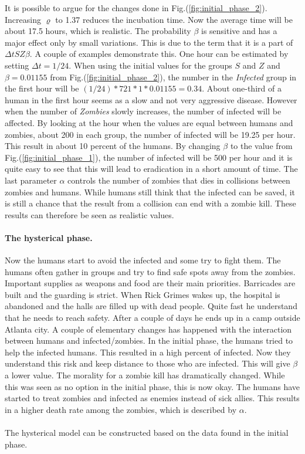 \documentclass[%
twoside,                 %
final,                   %
chapterprefix=true,      %
open=right               %
10pt]{book}
\begin{document}
It is possible to argue for the changes done in Fig.(\ref{fig:initial_phase_2}). Increasing $\varrho$ to 1.37 reduces the incubation time. Now the average time will be about 17.5 hours, which is realistic. The probability $\beta$ is sensitive and has a major effect only by small variations. This is due to the term that it is a part of $\Delta t SZ \beta$. A couple of examples demonstrate this. One hour can be estimated by setting $\Delta t = 1/24$. When using the initial values for the groups $S$ and $Z$ and $\beta=0.01155$ from Fig.(\ref{fig:initial_phase_2}), the number in the \emph{Infected} group in the first hour will be $(1/24)*721*1*0.01155=0.34$. About  one-third of a human in the first hour seems as a slow and not very aggressive disease. However when the number of \emph{Zombies} slowly increases, the number of infected will be affected. By looking at the hour when the values are equal between humans and zombies, about 200 in each group, the number of infected will be 19.25 per hour. This result in about 10 percent of the humans. By changing $\beta$ to the value from Fig.(\ref{fig:initial_phase_1}), the number of infected will be 500 per hour and it is quite easy to see that this will lead to eradication in a short amount of time. The last parameter $\alpha$ controls the number of zombies that dies in collisions between zombies and humans. While humans still think that the infected can be saved, it is still a chance that the result from a collision can end with a zombie kill. These results can therefore be seen as realistic values.

\paragraph{The hysterical phase.}
Now the humans start to avoid the infected and some try to fight them. The humans often gather in groups and try to find safe spots away from the zombies. Important supplies as weapons and food are their main priorities. Barricades are built and the guarding is strict. When Rick Grimes wakes up, the hospital is abandoned and the halls are filled up with dead people. Quite fast he understand that he needs to reach safety. After a couple of days he ends up in a camp outside Atlanta city. A couple of elementary changes has happened with the interaction between humans and infected/zombies. In the initial phase, the humans tried to help the infected humans. This resulted in a high percent of infected. Now they understand this risk and keep distance to those who are infected. This will give $\beta$ a lower value. The morality for a zombie kill has dramatically changed. While this was seen as no option in the initial phase, this is now okay. The humans have started to treat zombies and infected as enemies instead of sick allies. This results in a higher death rate among the zombies, which is described by $\alpha$. 
\\
\\
The hysterical model can be constructed based on the data found in the initial phase. 
\end{document}
